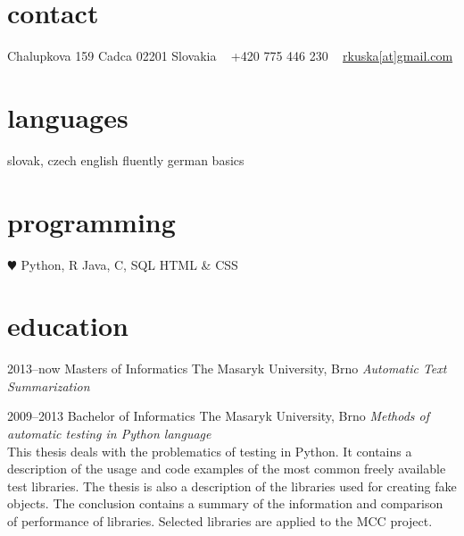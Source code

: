 \documentclass[]{friggeri-cv} %
\begin{document}


\begin{aside} %
\section{contact}
Chalupkova 159
Cadca 02201
Slovakia
~
+420 775 446 230
~
\href{mailto:rkuska@gmail.com}{rkuska[at]gmail.com}
\section{languages}
slovak, czech
english fluently
german basics 
\section{programming}
{\color{red} $\varheartsuit$} Python, R
Java, C, SQL
HTML \& CSS
\end{aside}


\section{education}

\begin{entrylist}


\entry
{2013--now}
{Masters {\normalfont of Informatics}}
{The Masaryk University, Brno}
{\emph{Automatic Text Summarization}}



\entry
{2009--2013}
{Bachelor {\normalfont of Informatics}}
{The Masaryk University, Brno}
{\emph{Methods of automatic testing in Python language} \\ This thesis deals with the problematics of testing in Python. It contains a description of the usage and code examples of the most common freely available test libraries. The thesis is also a description of the libraries used for creating fake objects. The conclusion contains a summary of the information and comparison of performance of libraries. Selected libraries are applied to the MCC project.}



\end{entrylist}
\end{document}
